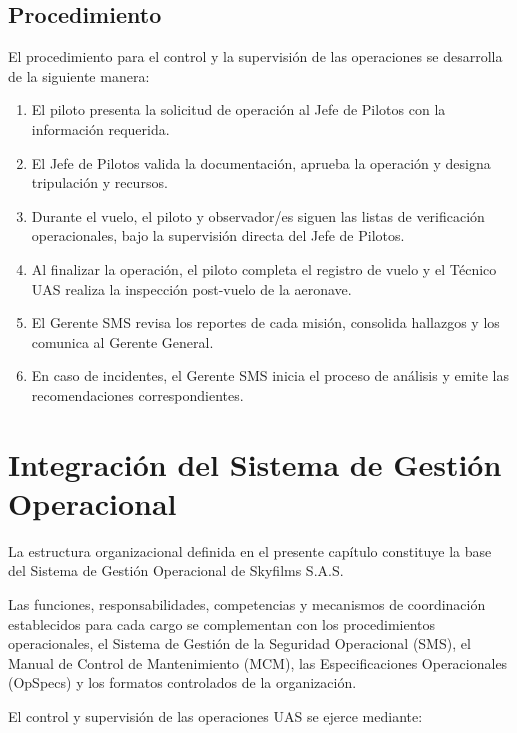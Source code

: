 \subsection*{Procedimiento}
El procedimiento para el control y la supervisión de las operaciones se desarrolla de la siguiente manera:
\begin{enumerate}
    \item El piloto presenta la solicitud de operación al Jefe de Pilotos con la información requerida.
    \item El Jefe de Pilotos valida la documentación, aprueba la operación y designa tripulación y recursos.
    \item Durante el vuelo, el piloto y observador/es siguen las listas de verificación operacionales, bajo la supervisión directa del Jefe de Pilotos.
    \item Al finalizar la operación, el piloto completa el registro de vuelo y el Técnico UAS realiza la inspección post-vuelo de la aeronave.
    \item El Gerente SMS revisa los reportes de cada misión, consolida hallazgos y los comunica al Gerente General.
    \item En caso de incidentes, el Gerente SMS inicia el proceso de análisis y emite las recomendaciones correspondientes.
\end{enumerate}



\section{Integración del Sistema de Gestión Operacional}

La estructura organizacional definida en el presente capítulo constituye la base del Sistema de Gestión Operacional de Skyfilms S.A.S.

Las funciones, responsabilidades, competencias y mecanismos de coordinación establecidos para cada cargo se complementan con los procedimientos operacionales, el Sistema de Gestión de la Seguridad Operacional (SMS), el Manual de Control de Mantenimiento (MCM), las Especificaciones Operacionales (OpSpecs) y los formatos controlados de la organización.

El control y supervisión de las operaciones UAS se ejerce mediante:

